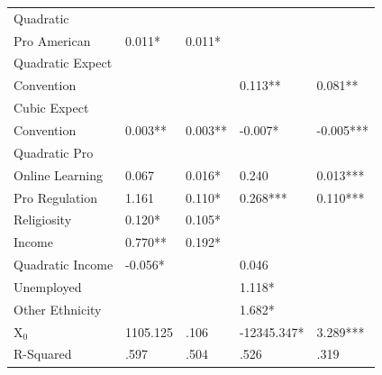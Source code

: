 \documentclass[AER]{./aea-latex-templates/AEA}
\begin{document}
\begin{table}
\begin{tabular}{lllll}
            Quadratic
            \\Pro American & 0.011* & 0.011* \\ %
            Quadratic Expect
            \\Convention &  &  & 0.113** & 0.081** \\ %
            Cubic Expect
            \\Convention & 0.003** & 0.003** & -0.007* & -0.005*** \\ %
            Quadratic Pro
            \\Online Learning & 0.067 & 0.016* & 0.240 & 0.013*** \\ %
            Pro Regulation & 1.161 & 0.110* & 0.268*** & 0.110*** \\ %
            Religiosity & 0.120* & 0.105* \\ %
            Income & 0.770** & 0.192* \\ %
            Quadratic Income & -0.056* &  & 0.046 &  \\ %
            Unemployed &  &  & 1.118* &  \\ %
            Other Ethnicity &  &  & 1.682* & \\ %
            X$_0$ & 1105.125 & .106 & -12345.347* & 3.289*** \\
            \bottomrule
            R-Squared & .597 & .504 & .526 & .319 %
        

\end{tabular}
\end{table}
\end{document}
